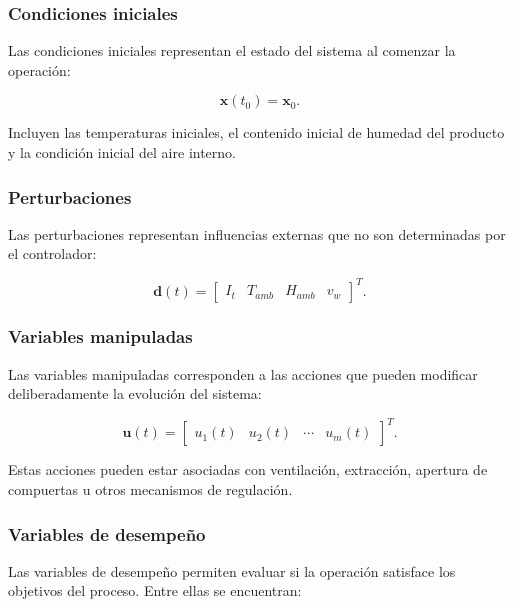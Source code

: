 \subsubsection{Condiciones iniciales}

Las condiciones iniciales representan el estado del sistema al comenzar la operación:

\begin{equation}
\mathbf{x}(t_0)=\mathbf{x}_0.
\end{equation}

Incluyen las temperaturas iniciales, el contenido inicial de humedad del producto y la condición inicial del aire interno.

\subsubsection{Perturbaciones}

Las perturbaciones representan influencias externas que no son determinadas por el controlador:

\begin{equation}
\mathbf{d}(t)
=
\begin{bmatrix}
I_t &
T_{amb} &
H_{amb} &
v_w
\end{bmatrix}^{T}.
\end{equation}

\subsubsection{Variables manipuladas}

Las variables manipuladas corresponden a las acciones que pueden modificar deliberadamente la evolución del sistema:

\begin{equation}
\mathbf{u}(t)
=
\begin{bmatrix}
u_1(t) &
u_2(t) &
\cdots &
u_m(t)
\end{bmatrix}^{T}.
\end{equation}

Estas acciones pueden estar asociadas con ventilación, extracción, apertura de compuertas u otros mecanismos de regulación.

\subsubsection{Variables de desempeño}

Las variables de desempeño permiten evaluar si la operación satisface los objetivos del proceso. Entre ellas se encuentran:

